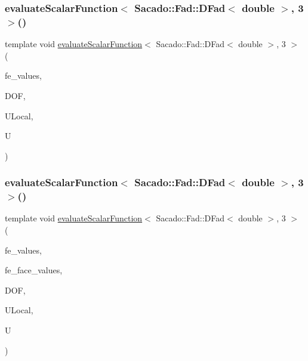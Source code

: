 \subsubsection{\texorpdfstring{evaluate\+Scalar\+Function$<$ Sacado\+::\+Fad\+::\+D\+Fad$<$ double $>$, 3 $>$()}{evaluateScalarFunction< Sacado::Fad::DFad< double >, 3 >()}\hspace{0.1cm}{\footnotesize\ttfamily [1/2]}}
{\footnotesize\ttfamily template void \mbox{\hyperlink{group___evaluation_functions_ga2e2fbeb2173113c6889c73bbb7304789}{evaluate\+Scalar\+Function}}$<$ Sacado\+::\+Fad\+::\+D\+Fad$<$ double $>$, 3 $>$ (\begin{DoxyParamCaption}\item[{const F\+E\+Values$<$ 3 $>$ \&}]{fe\+\_\+values,  }\item[{unsigned int}]{D\+OF,  }\item[{Table$<$ 1, Sacado\+::\+Fad\+::\+D\+Fad$<$ double $>$$>$ \&}]{U\+Local,  }\item[{Table$<$ 1, Sacado\+::\+Fad\+::\+D\+Fad$<$ double $>$$>$ \&}]{U }\end{DoxyParamCaption})}

\mbox{\label{function_evaluations_8cc_aff733718e441e77597fb5f7369b962d7}} 
\subsubsection{\texorpdfstring{evaluate\+Scalar\+Function$<$ Sacado\+::\+Fad\+::\+D\+Fad$<$ double $>$, 3 $>$()}{evaluateScalarFunction< Sacado::Fad::DFad< double >, 3 >()}\hspace{0.1cm}{\footnotesize\ttfamily [2/2]}}
{\footnotesize\ttfamily template void \mbox{\hyperlink{group___evaluation_functions_ga2e2fbeb2173113c6889c73bbb7304789}{evaluate\+Scalar\+Function}}$<$ Sacado\+::\+Fad\+::\+D\+Fad$<$ double $>$, 3 $>$ (\begin{DoxyParamCaption}\item[{const F\+E\+Values$<$ 3 $>$ \&}]{fe\+\_\+values,  }\item[{const F\+E\+Face\+Values$<$ 3 $>$ \&}]{fe\+\_\+face\+\_\+values,  }\item[{unsigned int}]{D\+OF,  }\item[{Table$<$ 1, Sacado\+::\+Fad\+::\+D\+Fad$<$ double $>$$>$ \&}]{U\+Local,  }\item[{Table$<$ 1, Sacado\+::\+Fad\+::\+D\+Fad$<$ double $>$$>$ \&}]{U }\end{DoxyParamCaption})}

